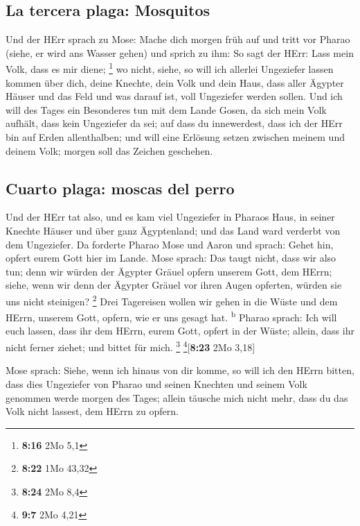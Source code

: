 \hypertarget{la-tercera-plaga-mosquitos}{%
\subsection{La tercera plaga:
Mosquitos}\label{la-tercera-plaga-mosquitos}}

 Und der HErr sprach zu Mose: Mache dich morgen früh auf
und tritt vor Pharao (siehe, er wird ans Wasser gehen) und sprich zu
ihm: So sagt der HErr: Lass mein Volk, dass es mir diene; \footnote{\textbf{8:16}
  2Mo 5,1}  wo nicht, siehe, so will ich allerlei
Ungeziefer lassen kommen über dich, deine Knechte, dein Volk und dein
Haus, dass aller Ägypter Häuser und das Feld und was darauf ist, voll
Ungeziefer werden sollen.  Und ich will des Tages ein
Besonderes tun mit dem Lande Gosen, da sich mein Volk aufhält, dass kein
Ungeziefer da sei; auf dass du innewerdest, dass ich der HErr bin auf
Erden allenthalben;  und will eine Erlösung setzen
zwischen meinem und deinem Volk; morgen soll das Zeichen geschehen.

\hypertarget{cuarto-plaga-moscas-del-perro}{%
\subsection{Cuarto plaga: moscas del
perro}\label{cuarto-plaga-moscas-del-perro}}

 Und der HErr tat also, und es kam viel Ungeziefer in
Pharaos Haus, in seiner Knechte Häuser und über ganz Ägyptenland; und
das Land ward verderbt von dem Ungeziefer.  Da forderte
Pharao Mose und Aaron und sprach: Gehet hin, opfert eurem Gott hier im
Lande.  Mose sprach: Das taugt nicht, dass wir also tun;
denn wir würden der Ägypter Gräuel opfern unserem Gott, dem HErrn;
siehe, wenn wir denn der Ägypter Gräuel vor ihren Augen opferten, würden
sie uns nicht steinigen? \footnote{\textbf{8:22} 1Mo 43,32}
 Drei Tagereisen wollen wir gehen in die Wüste und dem
HErrn, unserem Gott, opfern, wie er uns gesagt hat. \textsuperscript{b}
 Pharao sprach: Ich will euch lassen, dass ihr dem HErrn,
eurem Gott, opfert in der Wüste; allein, dass ihr nicht ferner ziehet;
und bittet für mich. \footnote{\textbf{8:24} 2Mo 8,4}
\footnote{\textbf{9:7} 2Mo 4,21}{[}\textbf{8:23} 2Mo 3,18{]}

 Mose sprach: Siehe, wenn ich hinaus von dir komme, so
will ich den HErrn bitten, dass dies Ungeziefer von Pharao und seinen
Knechten und seinem Volk genommen werde morgen des Tages; allein täusche
mich nicht mehr, dass du das Volk nicht lassest, dem HErrn zu opfern.

